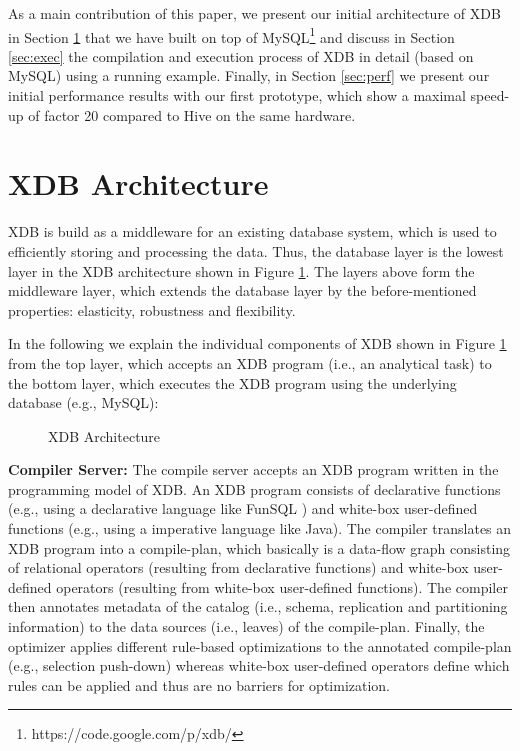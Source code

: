 \documentclass{sig-alternate}
\begin{document}
As a main contribution of this paper, we present our initial architecture of XDB in Section \ref{sec:xdb} that we have built on top of MySQL\footnote{https://code.google.com/p/xdb/} and discuss in Section \ref{sec:exec} the compilation and execution process of XDB in detail (based on MySQL) using a running example. Finally, in Section \ref{sec:perf} we present our initial performance results with our first prototype, which show a maximal speed-up of factor 20 compared to Hive on the same hardware.

\section{XDB Architecture}
\label{sec:xdb}

XDB is build as a middleware for an existing database system, which is used to efficiently storing and processing the data.
Thus, the database layer is the lowest layer in the  XDB architecture shown in Figure \ref{fig:xdb:architecture}. The layers above form the middleware layer, which extends the database layer by the before-mentioned properties: elasticity, robustness and flexibility. 

In the following we explain the individual components of XDB shown in Figure \ref{fig:xdb:architecture} from the top layer, which accepts an XDB program (i.e., an analytical task) to the bottom layer, which executes the XDB program using the underlying database (e.g., MySQL):\\

\begin{figure}
\hspace{-4ex}
\vspace{-4ex}
\caption{XDB Architecture}
\label{fig:xdb:architecture}
\vspace{-2ex}

\end{figure}

{\bf Compiler Server:} The compile server accepts an XDB program written in the programming model of XDB. An XDB program consists of declarative functions (e.g., using a declarative language like FunSQL \cite{FunSQL:DANAC:2012}) and white-box user-defined functions (e.g., using a imperative language like Java). The compiler translates an XDB program into a compile-plan, which basically is a data-flow graph consisting of relational operators (resulting from declarative functions) and white-box user-defined operators (resulting from white-box user-defined functions). The compiler then annotates metadata of the catalog (i.e., schema, replication and partitioning information) to the data sources (i.e., leaves) of the compile-plan. Finally, the optimizer applies different rule-based optimizations to the annotated compile-plan (e.g., selection push-down) whereas white-box user-defined operators define which rules can be applied and thus are no barriers for optimization.\\
\end{document}

